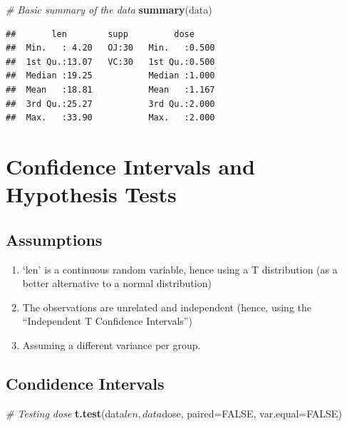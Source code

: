 \documentclass[]{article}
\newenvironment{Shaded}{\begin{snugshade}}{\end{snugshade}}
\newcommand{\KeywordTok}[1]{\textcolor[rgb]{0.13,0.29,0.53}{\textbf{{#1}}}}
\newcommand{\DataTypeTok}[1]{\textcolor[rgb]{0.13,0.29,0.53}{{#1}}}
\newcommand{\CommentTok}[1]{\textcolor[rgb]{0.56,0.35,0.01}{\textit{{#1}}}}
\newcommand{\OtherTok}[1]{\textcolor[rgb]{0.56,0.35,0.01}{{#1}}}
\newcommand{\NormalTok}[1]{{#1}}
\begin{document}
\begin{Shaded}
\begin{Highlighting}[]
\CommentTok{# Basic summary of the data}
\KeywordTok{summary}\NormalTok{(data)}
\end{Highlighting}
\end{Shaded}

\begin{verbatim}
##       len        supp         dose      
##  Min.   : 4.20   OJ:30   Min.   :0.500  
##  1st Qu.:13.07   VC:30   1st Qu.:0.500  
##  Median :19.25           Median :1.000  
##  Mean   :18.81           Mean   :1.167  
##  3rd Qu.:25.27           3rd Qu.:2.000  
##  Max.   :33.90           Max.   :2.000
\end{verbatim}

\section{Confidence Intervals and Hypothesis
Tests}\label{confidence-intervals-and-hypothesis-tests}

\subsection{Assumptions}\label{assumptions}

\begin{enumerate}
\def\labelenumi{\arabic{enumi}.}
\itemsep1pt\parskip0pt
\item
  `len' is a continuous random variable, hence using a T distribution
  (as a better alternative to a normal distribution)
\item
  The observations are unrelated and independent (hence, using the
  ``Independent T Confidence Intervals'')
\item
  Assuming a different variance per group.
\end{enumerate}

\subsection{Condidence Intervals}\label{condidence-intervals}

\begin{Shaded}
\begin{Highlighting}[]
\CommentTok{# Testing dose}
\KeywordTok{t.test}\NormalTok{(data$len, data$dose, }\DataTypeTok{paired=}\OtherTok{FALSE}\NormalTok{, }\DataTypeTok{var.equal=}\OtherTok{FALSE}\NormalTok{)}
\end{Highlighting}
\end{Shaded}
\end{document}
